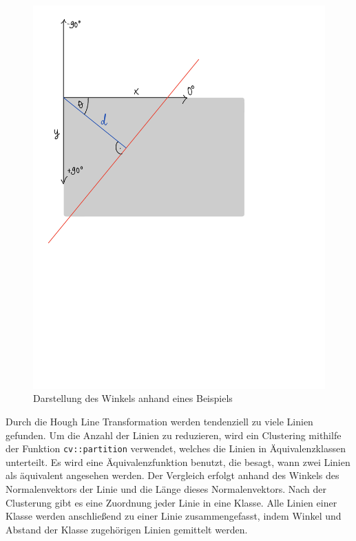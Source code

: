 \documentclass[a4paper,12pt]{report}
\begin{document}
	\begin{figure}
		\centering
		\includegraphics[height=0.5\textheight]{assets/Winkelnormalisierung.pdf}
		\caption{Darstellung des Winkels anhand eines Beispiels}
		\label{img-Winkelnormalisierung}
	\end{figure}

	Durch die Hough Line Transformation werden tendenziell zu viele Linien gefunden. Um die Anzahl der Linien zu reduzieren, wird ein Clustering mithilfe der Funktion \texttt{cv::partition} verwendet, welches die Linien in Äquivalenzklassen unterteilt. Es wird eine Äquivalenzfunktion benutzt, die besagt, wann zwei Linien als äquivalent angesehen werden. Der Vergleich erfolgt anhand des Winkels des Normalenvektors der Linie und die Länge dieses Normalenvektors. Nach der Clusterung gibt es eine Zuordnung jeder Linie in eine Klasse. Alle Linien einer Klasse werden anschließend zu einer Linie zusammengefasst, indem Winkel und Abstand der Klasse zugehörigen Linien gemittelt werden.
\end{document}
